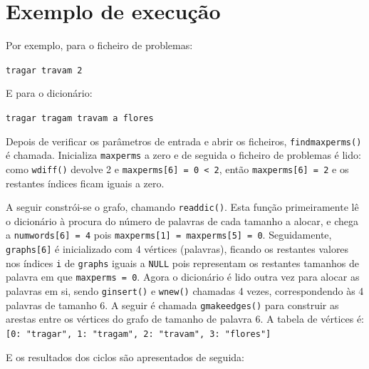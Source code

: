 \documentclass[a4paper, 18pt]{article}
\begin{document}
\section{Exemplo de execução}
	\par
	Por exemplo, para o ficheiro de problemas:
	\begin{center}
		\texttt{tragar travam 2}
	\end{center}
	\par
	E para o dicionário:
	\begin{center}
		\texttt{tragar tragam travam a flores}
	\end{center}
	\par
	Depois de verificar os parâmetros de entrada e abrir os ficheiros, \texttt{find\textunderscore max\textunderscore perms()} é chamada.
	Inicializa \texttt{max\textunderscore perms} a zero e de seguida o ficheiro de problemas é lido: como \texttt{w\textunderscore diff()} devolve 2 e \texttt{max\textunderscore perms[6] = 0 < 2}, então \texttt{max\textunderscore perms[6] = 2} e os restantes índices ficam iguais a zero.
	\par
	A seguir constrói-se o grafo, chamando \texttt{read\textunderscore dic()}. Esta função primeiramente lê o dicionário à procura do número de palavras de cada tamanho a alocar, e chega a \texttt{num\textunderscore words[6] = 4} pois \texttt{max\textunderscore perms[1] = max\textunderscore perms[5] = 0}. Seguidamente, \texttt{graphs[6]} é inicializado com 4 vértices (palavras), ficando os restantes valores nos índices \texttt{i} de \texttt{graphs} iguais a \texttt{NULL} pois representam os restantes tamanhos de palavra em que \texttt{max\textunderscore perms = 0}. Agora o dicionário é lido outra vez para alocar as palavras em si, sendo \texttt{g\textunderscore insert()} e \texttt{w\textunderscore new()} chamadas 4 vezes, correspondendo às 4 palavras de tamanho 6. A seguir é chamada \texttt{g\textunderscore make\textunderscore edges()} para construir as arestas entre os vértices do grafo de tamanho de palavra 6. A tabela de vértices é:
	\texttt{[0: "tragar", 1: "tragam", 2: "travam", 3: "flores"]}
	\par
	E os resultados dos ciclos são apresentados de seguida:
\end{document}
